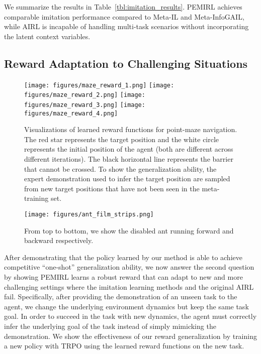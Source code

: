 We summarize the results in Table~\ref{tbl:imitation_results}. PEMIRL achieves comparable imitation performance compared to Meta-IL and Meta-InfoGAIL, while AIRL is incapable of handling multi-task scenarios without incorporating the latent context variables.

\subsection{Reward Adaptation to Challenging Situations}


\begin{figure*}[!t]
    \centering
    \texttt{[image: figures/maze\_reward\_1.png]}
    \texttt{[image: figures/maze\_reward\_2.png]}
    \texttt{[image: figures/maze\_reward\_3.png]}
    \texttt{[image: figures/maze\_reward\_4.png]}
\caption{Visualizations of learned reward functions for point-maze navigation. The red star represents the target position and the white circle represents the initial position of the agent (both are different across different iterations). The black horizontal line represents the barrier that cannot be crossed. To show the generalization ability, the expert demonstration used to infer the target position are sampled from new target positions that have not been seen in the meta-training set.
    }
\label{fig:maze_reward_fig}
\end{figure*}

\begin{figure*}[!t]
    \centering
    \texttt{[image: figures/ant\_film\_strips.png]}
\caption{From top to bottom, we show the disabled ant running forward and backward respectively.
    }
\label{fig:ant_film_strips}
\end{figure*}

After demonstrating that the policy learned by our method is able to achieve competitive ``one-shot'' generalization ability, we now answer the second question by showing PEMIRL learns a robust reward that can adapt to new and more challenging settings where the imitation learning methods and the original AIRL fail. Specifically, after providing the demonstration of an unseen task to the agent, we change the underlying environment dynamics but keep the same task goal. In order to succeed in the task with new dynamics, the agent must correctly infer the underlying goal of the task instead of simply mimicking the demonstration. We show the effectiveness of our reward generalization by training a new policy with TRPO using the learned reward functions on the new task.

